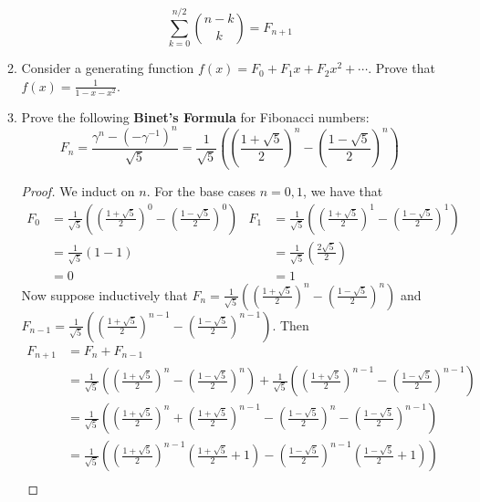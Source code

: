 \documentclass[../main.tex]{subfiles}
\begin{document}
\begin{enumerate}
\begin{enumerate}
        \begin{equation*}
            \sum_{k=0}^{n/2}\binom{n-k}{k} = F_{n+1}
        \end{equation*}
        \item Consider a generating function $f(x)=F_0+F_1x+F_2x^2+\cdots$. Prove that $f(x)=\frac{1}{1-x-x^2}$.
        \item Prove the following \textbf{Binet's Formula} for Fibonacci numbers:
        \begin{equation*}
            F_n = \frac{\gamma^n-(-\gamma^{-1})^n}{\sqrt{5}}
            = \frac{1}{\sqrt{5}}\left( \left( \frac{1+\sqrt{5}}{2} \right)^n-\left( \frac{1-\sqrt{5}}{2} \right)^n \right)
        \end{equation*}
        \begin{proof}
            We induct on $n$. For the base cases $n=0,1$, we have that
            \begin{align*}
                F_0 &= \frac{1}{\sqrt{5}}\left( \left( \frac{1+\sqrt{5}}{2} \right)^0-\left( \frac{1-\sqrt{5}}{2} \right)^0 \right)&
                    F_1 &= \frac{1}{\sqrt{5}}\left( \left( \frac{1+\sqrt{5}}{2} \right)^1-\left( \frac{1-\sqrt{5}}{2} \right)^1 \right)\\
                &= \frac{1}{\sqrt{5}}(1-1)&
                    &= \frac{1}{\sqrt{5}}\left( \frac{2\sqrt{5}}{2} \right)\\
                &= 0&
                    &= 1
            \end{align*}
            Now suppose inductively that $F_n=\frac{1}{\sqrt{5}}\left( \left( \frac{1+\sqrt{5}}{2} \right)^n-\left( \frac{1-\sqrt{5}}{2} \right)^n \right)$ and $F_{n-1}=\frac{1}{\sqrt{5}}\left( \left( \frac{1+\sqrt{5}}{2} \right)^{n-1}-\left( \frac{1-\sqrt{5}}{2} \right)^{n-1} \right)$. Then
            \begingroup
            \allowdisplaybreaks
            \begin{align*}
                F_{n+1} &= F_n+F_{n-1}\\
                &= \frac{1}{\sqrt{5}}\left( \left( \frac{1+\sqrt{5}}{2} \right)^n-\left( \frac{1-\sqrt{5}}{2} \right)^n \right)+\frac{1}{\sqrt{5}}\left( \left( \frac{1+\sqrt{5}}{2} \right)^{n-1}-\left( \frac{1-\sqrt{5}}{2} \right)^{n-1} \right)\\
                &= \frac{1}{\sqrt{5}}\left( \left( \frac{1+\sqrt{5}}{2} \right)^n+\left( \frac{1+\sqrt{5}}{2} \right)^{n-1}-\left( \frac{1-\sqrt{5}}{2} \right)^n-\left( \frac{1-\sqrt{5}}{2} \right)^{n-1} \right)\\
                &= \frac{1}{\sqrt{5}}\left( \left( \frac{1+\sqrt{5}}{2} \right)^{n-1}\left( \frac{1+\sqrt{5}}{2}+1 \right)-\left( \frac{1-\sqrt{5}}{2} \right)^{n-1}\left( \frac{1-\sqrt{5}}{2}+1 \right) \right)\\

\end{align*}
\end{proof}
\end{enumerate}
\end{enumerate}
\end{document}
